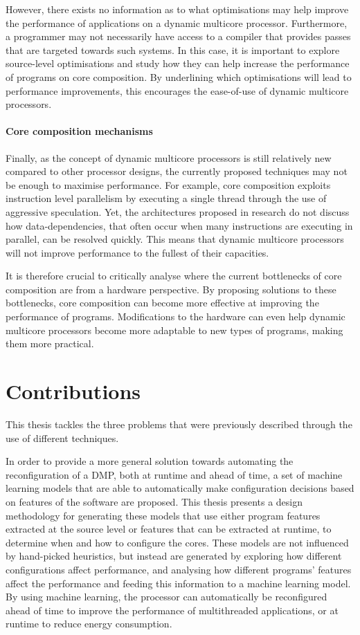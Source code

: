 However, there exists no information as to what optimisations may help improve the performance of applications on a dynamic multicore processor.
Furthermore, a programmer may not necessarily have access to a compiler that provides passes that are targeted towards such systems.
In this case, it is important to explore source-level optimisations and study how they can help increase the performance of programs on core composition.
By underlining which optimisations will lead to performance improvements, this encourages the ease-of-use of dynamic multicore processors.

\paragraph*{Core composition mechanisms} 
Finally, as the concept of dynamic multicore processors is still relatively new compared to other processor designs, the currently proposed techniques may not be enough to maximise performance.
For example, core composition exploits instruction level parallelism by executing a single thread through the use of aggressive speculation.
Yet, the architectures proposed in research do not discuss how data-dependencies, that often occur when many instructions are executing in parallel, can be resolved quickly.
This means that dynamic multicore processors will not improve performance to the fullest of their capacities.

It is therefore crucial to critically analyse where the current bottlenecks of core composition are from a hardware perspective.
By proposing solutions to these bottlenecks, core composition can become more effective at improving the performance of programs.
Modifications to the hardware can even help dynamic multicore processors become more adaptable to new types of programs, making them more practical.


\section{Contributions}
This thesis tackles the three problems that were previously described through the use of different techniques.

In order to provide a more general solution towards automating the reconfiguration of a DMP, both at runtime and ahead of time, a set of machine learning models that are able to automatically make configuration decisions based on features of the software are proposed.
This thesis presents a design methodology for generating these models that use either program features extracted at the source level or features that can be extracted at runtime, to determine when and how to configure the cores.
These models are not influenced by hand-picked heuristics, but instead are generated by exploring how different configurations affect performance, and analysing how different programs' features affect the performance and feeding this information to a machine learning model.
By using machine learning, the processor can automatically be reconfigured ahead of time to improve the performance of multithreaded applications, or at runtime to reduce energy consumption.

